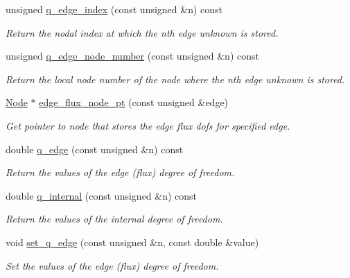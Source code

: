 \begin{DoxyCompactItemize}
unsigned \hyperlink{classoomph_1_1TRaviartThomasDarcyElement_a5c0de6706bca0a9b006832dd8df30b81}{q\+\_\+edge\+\_\+index} (const unsigned \&n) const
\begin{DoxyCompactList}\small\item\em Return the nodal index at which the nth edge unknown is stored. \end{DoxyCompactList}\item 
unsigned \hyperlink{classoomph_1_1TRaviartThomasDarcyElement_a81e9386364c70670d6ee4d501cc89da5}{q\+\_\+edge\+\_\+node\+\_\+number} (const unsigned \&n) const
\begin{DoxyCompactList}\small\item\em Return the local node number of the node where the nth edge unknown is stored. \end{DoxyCompactList}\item 
\hyperlink{classoomph_1_1Node}{Node} $\ast$ \hyperlink{classoomph_1_1TRaviartThomasDarcyElement_a08f0a6dd7e8930dfc45d7c1673b185e6}{edge\+\_\+flux\+\_\+node\+\_\+pt} (const unsigned \&edge)
\begin{DoxyCompactList}\small\item\em Get pointer to node that stores the edge flux dofs for specified edge. \end{DoxyCompactList}\item 
double \hyperlink{classoomph_1_1TRaviartThomasDarcyElement_a822218aa30be662198873b8b73a0c03c}{q\+\_\+edge} (const unsigned \&n) const
\begin{DoxyCompactList}\small\item\em Return the values of the edge (flux) degree of freedom. \end{DoxyCompactList}\item 
double \hyperlink{classoomph_1_1TRaviartThomasDarcyElement_a613264c01085a511a3c30f3f78f00c50}{q\+\_\+internal} (const unsigned \&n) const
\begin{DoxyCompactList}\small\item\em Return the values of the internal degree of freedom. \end{DoxyCompactList}\item 
void \hyperlink{classoomph_1_1TRaviartThomasDarcyElement_ad4d0783e51faa448cbbd1978bf4779df}{set\+\_\+q\+\_\+edge} (const unsigned \&n, const double \&value)
\begin{DoxyCompactList}\small\item\em Set the values of the edge (flux) degree of freedom. \end{DoxyCompactList}\item 

\end{DoxyCompactItemize}
